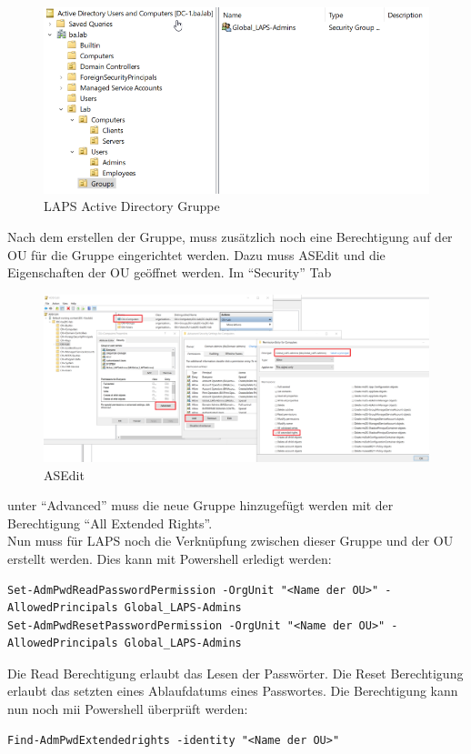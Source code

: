 \begin{figure}[H]
    \centering
    \includegraphics[width=\linewidth]{../img/LAPS/Laps-Admins.png}
    \caption{LAPS Active Directory Gruppe}
\end{figure}

Nach dem erstellen der Gruppe, muss zusätzlich noch eine Berechtigung auf der OU für die Gruppe eingerichtet werden.
Dazu muss ASEdit und die Eigenschaften der OU geöffnet werden. Im ``Security'' Tab
\begin{figure}[H]
    \centering
    \includegraphics[width=0.7\linewidth]{../img/LAPS/ASEdit.png}
    \caption{ASEdit}
\end{figure}
unter ``Advanced'' muss die neue Gruppe hinzugefügt werden mit der Berechtigung ``All Extended Rights''.\\

Nun muss für LAPS noch die Verknüpfung zwischen dieser Gruppe und der OU erstellt werden.
Dies kann mit Powershell erledigt werden:
\begin{lstlisting}
Set-AdmPwdReadPasswordPermission -OrgUnit "<Name der OU>" -AllowedPrincipals Global_LAPS-Admins
Set-AdmPwdResetPasswordPermission -OrgUnit "<Name der OU>" -AllowedPrincipals Global_LAPS-Admins
\end{lstlisting}
Die Read Berechtigung erlaubt das Lesen der Passwörter.
Die Reset Berechtigung erlaubt das setzten eines Ablaufdatums eines Passwortes.
Die Berechtigung kann nun noch mii Powershell überprüft werden:
\begin{lstlisting}
Find-AdmPwdExtendedrights -identity "<Name der OU>"
\end{lstlisting}


